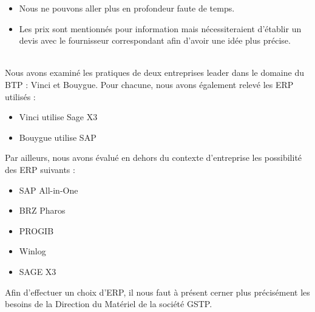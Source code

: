 \documentclass[a4paper]{article}
\begin{document}
\begin{itemize}
\item Nous ne pouvons aller plus en profondeur faute de temps.
\item Les prix sont mentionnés pour information mais nécessiteraient
d'établir un devis avec le fournisseur correspondant afin d'avoir une idée
plus précise.
\end{itemize}

\hfill\\

Nous avons examiné les pratiques de deux entreprises leader dans le domaine
du BTP : Vinci et Bouygue. Pour chacune, nous avons également relevé les
ERP utilisés :

\begin{itemize}
\item Vinci utilise Sage X3
\item Bouygue utilise SAP
\end{itemize}

\vskip 6pt

Par ailleurs, nous avons évalué en dehors du contexte d'entreprise les possibilité des ERP suivants :

\begin{itemize}
\item SAP All-in-One
\item BRZ Pharos
\item PROGIB
\item Winlog
\item SAGE X3
\end{itemize}

\vskip 6pt

Afin d'effectuer un choix d'ERP, il nous faut à présent cerner plus
précisément les besoins de la Direction du Matériel de la société GSTP.
\end{document}
